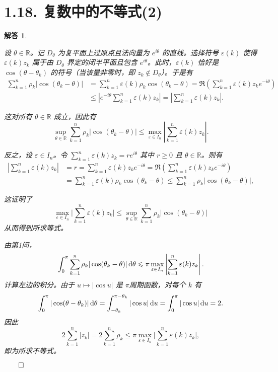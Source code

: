 \documentclass[12pt,UTF8]{ctexbook}
\theoremstyle{exercisestyle}
\theoremstyle{solutionstyle}
\newtheorem*{solution*}{解答}
\newenvironment{solution}
  {\begin{solution*}}
  {\hfill\ensuremath{\qed}\end{solution*}}
\begin{document}
\section{1.18. 复数中的不等式(2)}
\begin{solution}
\begin{subquestions}
\item 设 \( \theta \in \mathbb{R} \)。记 \( D_{\theta} \) 为复平面上过原点且法向量为 \( e^{i\theta} \) 的直线。选择符号 \( \varepsilon(k) \) 使得 \( \varepsilon(k)z_k \) 属于由 \( D_{\theta} \) 界定的闭半平面且包含 \( e^{i\theta} \)。此时，\( \varepsilon(k) \) 恰好是 \( \cos(\theta - \theta_k) \) 的符号（当该量非零时，即 \( z_k \notin D_\theta \)）。于是有
\begin{align*}
\sum_{k=1}^{n} \rho_k |\cos(\theta_k - \theta)| &= \sum_{k=1}^{n} \varepsilon(k)\rho_k \cos(\theta_k - \theta) = \Re \left(\sum_{k=1}^{n} \varepsilon(k)z_k e^{-i\theta}\right)\\
&\leqslant \left|e^{-i\theta} \sum_{k=1}^{n} \varepsilon(k)z_k\right| = \left|\sum_{k=1}^{n} \varepsilon(k)z_k\right|.
\end{align*}

这对所有 \( \theta \in \mathbb{R} \) 成立，因此有
\[
\sup_{\theta \in \mathbb{R}} \sum_{k=1}^n \rho_k |\cos(\theta_k - \theta)| \leqslant \max_{\varepsilon \in I_n} \left| \sum_{k=1}^n \varepsilon(k) z_k \right|.
\]

反之，设 \( \varepsilon \in I_n \)。令 \( \sum_{k=1}^n \varepsilon(k) z_k = r e^{i\theta} \) 其中 \( r \geq 0 \) 且 \( \theta \in \mathbb{R} \)。则有
\begin{align*}  
\left| \sum_{k=1}^{n} \varepsilon(k) z_k \right| &= r = \sum_{k=1}^{n} \varepsilon(k) z_k e^{-i\theta} = \Re \left( \sum_{k=1}^{n} \varepsilon(k) z_k e^{-i\theta} \right) \\
&= \sum_{k=1}^{n} \varepsilon(k) \rho_k \cos(\theta_k - \theta) \leqslant \sum_{k=1}^{n} \rho_k |\cos(\theta_k - \theta)|,
\end{align*}

这证明了
\[
\max_{\varepsilon \in I_n} \Big| \sum_{k=1}^n \varepsilon(k) z_k \Big| \leqslant \sup_{\theta \in \mathbb{R}} \sum_{k=1}^n \rho_k |\cos(\theta_k - \theta)|
\]
从而得到所求等式。

\item 由第1问，
\[
\int_0^{\pi} \sum_{k=1}^n \rho_k |\cos(\theta_k - \theta)| \,\mathrm{d}\theta \leqslant \pi \max_{\varepsilon \in I_n} \left| \sum_{k=1}^n \varepsilon(k) z_k \right|.
\]
计算左边的积分。由于 \( u \mapsto |\cos u| \) 是 \(\pi\)\dash 周期函数，对每个 \(k\) 有
\[
\int_0^{\pi} |\cos(\theta - \theta_k)| \,\mathrm{d}\theta = \int_{-\theta_k}^{\pi - \theta_k} |\cos u| \,\mathrm{d}u = \int_0^{\pi} |\cos u| \,\mathrm{d}u = 2.
\]
因此
\[
2\sum_{k=1}^{n}|z_{k}|=2\sum_{k=1}^{n}\rho_{k}\leqslant\pi\max_{\varepsilon\in I_{n}}\Big|\sum_{k=1}^{n}\varepsilon(k)z_{k}\Big|,
\]
即为所求不等式。


\end{subquestions}
\end{solution}
\end{document}
